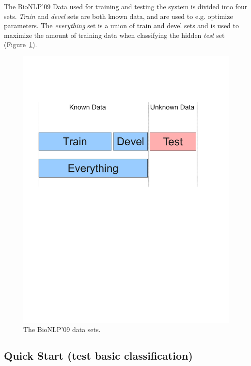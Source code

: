 \documentclass[a4paper,12pt]{article}
\begin{document}
The BioNLP'09 Data used for training and testing the system is divided into
four sets. \emph{Train} and \emph{devel} sets are both known data, and are used
to e.g. optimize parameters. The \emph{everything} set is a union of train and
devel sets and is used to maximize the amount of training data when classifying
the hidden \emph{test} set (Figure~\ref{fig-sets}).

\begin{figure}[h]
\begin{center}
\includegraphics[trim = 0mm 150mm 0mm 50mm,
clip,scale=0.5]{Figures/DataSets.pdf}
\end{center}
\caption{The BioNLP'09 data sets.}
\label{fig-sets}
\end{figure}

\subsection{Quick Start (test basic classification)}
\end{document}
